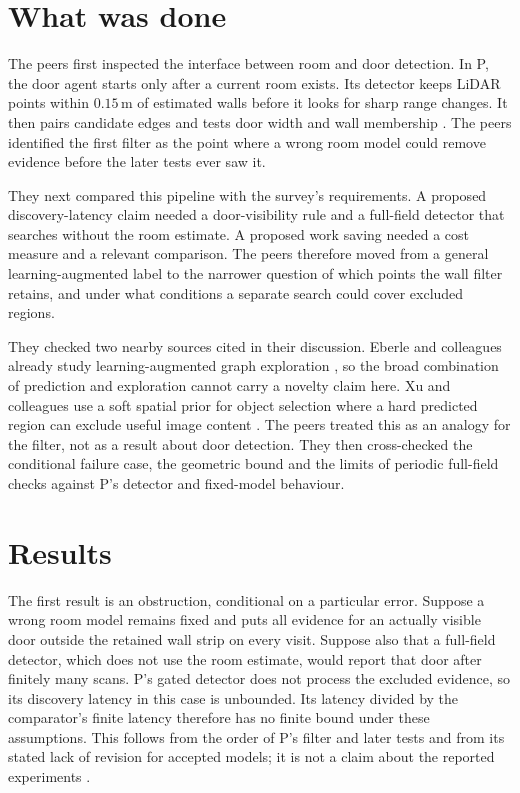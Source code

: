 \documentclass{article}
\begin{document}
\section{What was done}

The peers first inspected the interface between room and door detection. In P, the door agent starts
only after a current room exists. Its detector keeps LiDAR points within \(0.15\,\mathrm{m}\) of
estimated walls before it looks for sharp range changes. It then pairs candidate edges and tests
door width and wall membership \cite{P}. The peers identified the first filter as the point where a
wrong room model could remove evidence before the later tests ever saw it.

They next compared this pipeline with the survey's requirements. A proposed discovery-latency claim
needed a door-visibility rule and a full-field detector that searches without the room estimate. A
proposed work saving needed a cost measure and a relevant comparison. The peers therefore moved from
a general learning-augmented label to the narrower question of which points the wall filter retains,
and under what conditions a separate search could cover excluded regions.

They checked two nearby sources cited in their discussion. Eberle and colleagues already study
learning-augmented graph exploration \cite{Eberle2021}, so the broad combination of prediction and
exploration cannot carry a novelty claim here. Xu and colleagues use a soft spatial prior for object
selection where a hard predicted region can exclude useful image content \cite{Xu2017}. The peers
treated this as an analogy for the filter, not as a result about door detection. They then
cross-checked the conditional failure case, the geometric bound and the limits of periodic
full-field checks against P's detector and fixed-model behaviour.

\section{Results}

The first result is an obstruction, conditional on a particular error. Suppose a wrong room model
remains fixed and puts all evidence for an actually visible door outside the retained wall strip on
every visit. Suppose also that a full-field detector, which does not use the room estimate, would
report that door after finitely many scans. P's gated detector does not process the excluded
evidence, so its discovery latency in this case is unbounded. Its latency divided by the
comparator's finite latency therefore has no finite bound under these assumptions. This follows from
the order of P's filter and later tests and from its stated lack of revision for accepted models; it
is not a claim about the reported experiments \cite{P}.
\end{document}
